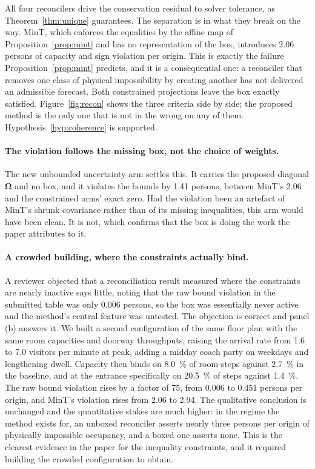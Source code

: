 \documentclass[11pt]{article}
\theoremstyle{plain}
\theoremstyle{definition}
\theoremstyle{remark}
\newcommand{\bOm}{\bm{\Omega}}
\newif\ifrevisionmarkup
\newcommand{\new}[1]{\ifrevisionmarkup\textcolor{revision}{#1}\else#1\fi}
\begin{document}
All \new{four} reconcilers drive the conservation residual to solver tolerance, as Theorem~\ref{thm:unique} guarantees. The separation is in what they break on the way. MinT, which enforces the equalities by the \new{affine} map of Proposition~\ref{prop:mint} and has no representation of the box, introduces \new{\num{2.06}} persons of capacity and sign violation per origin. This is exactly the failure Proposition~\ref{prop:mint} predicts, and it is a consequential one: a reconciler that removes one class of physical impossibility by creating another has not delivered an admissible forecast. Both constrained projections leave the box exactly satisfied. Figure~\ref{fig:recon} shows the three criteria side by side; the proposed method is the only one that is not in the wrong on any of them. Hypothesis~\ref{hyp:coherence} is supported.

\new{\paragraph{The violation follows the missing box, not the choice of weights.} The new unbounded uncertainty arm settles this. It carries the proposed diagonal $\bOm$ and no box, and it violates the bounds by \num{1.41} persons, between MinT's \num{2.06} and the constrained arms' exact zero. Had the violation been an artefact of MinT's shrunk covariance rather than of its missing inequalities, this arm would have been clean. It is not, which confirms that the box is doing the work the paper attributes to it.}

\new{\paragraph{A crowded building, where the constraints actually bind.} A reviewer objected that a reconciliation result measured where the constraints are nearly inactive says little, noting that the raw bound violation in the submitted table was only \num{0.006} persons, so the box was essentially never active and the method's central feature was untested. The objection is correct and panel (b) answers it. We built a second configuration of the same floor plan with the same room capacities and doorway throughputs, raising the arrival rate from \num{1.6} to \num{7.0} visitors per minute at peak, adding a midday coach party on weekdays and lengthening dwell. Capacity then binds on \SI{8.0}{\percent} of room-steps against \SI{2.7}{\percent} in the baseline, and at the entrance specifically on \SI{20.5}{\percent} of steps against \SI{1.4}{\percent}. The raw bound violation rises by a factor of \num{75}, from \num{0.006} to \num{0.451} persons per origin, and MinT's violation rises from \num{2.06} to \num{2.94}. The qualitative conclusion is unchanged and the quantitative stakes are much higher: in the regime the method exists for, an unboxed reconciler asserts nearly three persons per origin of physically impossible occupancy, and a boxed one asserts none. This is the clearest evidence in the paper for the inequality constraints, and it required building the crowded configuration to obtain.}
\end{document}
